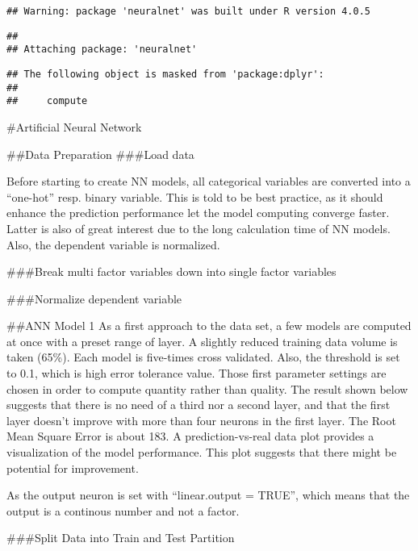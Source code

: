 \documentclass[
]{article}
\newenvironment{Shaded}{\begin{snugshade}}{\end{snugshade}}
\newcommand{\AttributeTok}[1]{\textcolor[rgb]{0.77,0.63,0.00}{#1}}
\newcommand{\DecValTok}[1]{\textcolor[rgb]{0.00,0.00,0.81}{#1}}
\newcommand{\FunctionTok}[1]{\textcolor[rgb]{0.00,0.00,0.00}{#1}}
\newcommand{\NormalTok}[1]{#1}
\newcommand{\OtherTok}[1]{\textcolor[rgb]{0.56,0.35,0.01}{#1}}
\newcommand{\SpecialCharTok}[1]{\textcolor[rgb]{0.00,0.00,0.00}{#1}}
\begin{document}
\begin{verbatim}
## Warning: package 'neuralnet' was built under R version 4.0.5
\end{verbatim}

\begin{verbatim}
## 
## Attaching package: 'neuralnet'
\end{verbatim}

\begin{verbatim}
## The following object is masked from 'package:dplyr':
## 
##     compute
\end{verbatim}

\#Artificial Neural Network

\#\#Data Preparation \#\#\#Load data

Before starting to create NN models, all categorical variables are
converted into a ``one-hot'' resp. binary variable. This is told to be
best practice, as it should enhance the prediction performance let the
model computing converge faster. Latter is also of great interest due to
the long calculation time of NN models. Also, the dependent variable is
normalized.

\#\#\#Break multi factor variables down into single factor variables

\#\#\#Normalize dependent variable

\#\#ANN Model 1 As a first approach to the data set, a few models are
computed at once with a preset range of layer. A slightly reduced
training data volume is taken (65\%). Each model is five-times cross
validated. Also, the threshold is set to 0.1, which is high error
tolerance value. Those first parameter settings are chosen in order to
compute quantity rather than quality. The result shown below suggests
that there is no need of a third nor a second layer, and that the first
layer doesn't improve with more than four neurons in the first layer.
The Root Mean Square Error is about 183. A prediction-vs-real data plot
provides a visualization of the model performance. This plot suggests
that there might be potential for improvement.

As the output neuron is set with ``linear.output = TRUE'', which means
that the output is a continous number and not a factor.

\#\#\#Split Data into Train and Test Partition

\begin{Shaded}
\end{Shaded}
\end{document}
